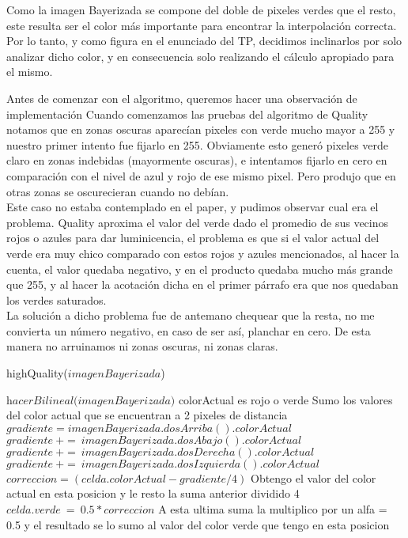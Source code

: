 Como la imagen Bayerizada se compone del doble de pixeles verdes que el resto, este resulta ser el color más importante para encontrar la interpolación correcta. Por lo tanto, y como figura en el enunciado del TP, decidimos inclinarlos por solo analizar dicho color, y en consecuencia solo realizando el cálculo apropiado para el mismo.

Antes de comenzar con el algoritmo, queremos hacer una observación de implementación
Cuando comenzamos las pruebas del algoritmo de Quality notamos que en zonas oscuras aparecían pixeles con verde mucho mayor a 255 y nuestro primer intento fue fijarlo en 255. Obviamente esto generó pixeles verde claro en zonas indebidas (mayormente oscuras), e intentamos fijarlo en cero en comparación con el nivel de azul y rojo de ese mismo pixel. Pero produjo que en otras zonas se oscurecieran cuando no debían.\\
Este caso no estaba contemplado en el paper, y pudimos observar cual era el problema. Quality aproxima el valor del verde dado el promedio de sus vecinos rojos o azules para dar luminicencia, el problema es que si el valor actual del verde era muy chico comparado con estos rojos y azules mencionados, al hacer la cuenta, el valor quedaba negativo, y en el producto quedaba mucho más grande que 255, y al hacer la acotación dicha en el primer párrafo era que nos quedaban los verdes saturados.\\
La solución a dicho problema fue de antemano chequear que la resta, no me convierta un número negativo, en caso de ser así, planchar en cero. De esta manera no arruinamos ni zonas oscuras, ni zonas claras.

\begin{algorithm}
\caption{highQuality($imagenBayerizada$)}\label{euclid}
\begin{algorithmic}[1]
\State $\textit{hacerBilineal(imagenBayerizada)}$
      	\Comment colorActual es rojo o verde
 \State \Comment Sumo los valores del color actual que se encuentran a 2 pixeles de distancia 
	 \State $gradiente = imagenBayerizada.dosArriba().colorActual$ 
	\State $gradiente\ +=\ imagenBayerizada.dosAbajo().colorActual$
	\State $gradiente\ +=\ imagenBayerizada.dosDerecha().colorActual$
	\State $gradiente\ +=\ imagenBayerizada.dosIzquierda().colorActual$
\State $correccion = (celda.colorActual - gradiente/4)$ \Comment Obtengo el valor del color actual en esta posicion y le resto la suma anterior dividido 4
\State $celda.verde\ =\ 0.5 * correccion$ \Comment  A esta ultima suma la multiplico por un alfa = 0.5 y el resultado se lo sumo al valor del color verde que tengo en esta posicion
      
  \EndIf
\EndFor
\end{algorithmic}
\end{algorithm}

